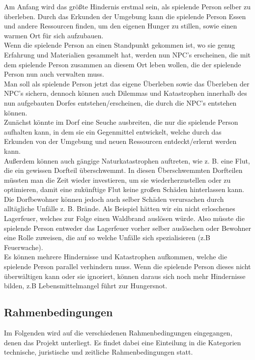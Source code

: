 \documentclass[paper=A4,pagesize=auto,12pt,headinclude=true,footinclude=true,BCOR=0mm,DIV=calc]{scrartcl}
\newcommand{\sectionspace}{
	\vspace{0.5cm}
}
\begin{document}
Am Anfang wird das größte Hindernis erstmal sein, als spielende Person selber zu überleben.
Durch das Erkunden der Umgebung kann die spielende Person Essen und andere Ressourcen finden, um den eigenen Hunger zu stillen, sowie einen warmen Ort für sich aufzubauen.\\
Wenn die spielende Person an einen Standpunkt gekommen ist, wo sie genug Erfahrung und Materialien gesammelt hat, werden nun NPC’s erscheinen, die mit dem spielende Person zusammen an diesem Ort leben wollen, die der spielende Person nun auch verwalten muss.\\
Man soll als spielende Person jetzt das eigene Überleben sowie das Überleben der NPC’s sichern, dennoch können auch Dilemmas und Katastrophen innerhalb des nun aufgebauten Dorfes entstehen/erscheinen, die durch die NPC’s entstehen können.\\
Zunächst könnte im Dorf eine Seuche ausbreiten, die nur die spielende Person aufhalten kann, in dem sie ein Gegenmittel entwickelt, welche durch das Erkunden von der Umgebung und neuen Ressourcen entdeckt/erlernt werden kann. \\
Außerdem können auch gängige Naturkatastrophen auftreten, wie z. B. eine Flut, die ein gewissen Dorfteil überschwemmt. In diesen Überschwemmten Dorfteilen müssten man die Zeit wieder investieren, um sie wiederherzustellen oder zu optimieren, damit eine zukünftige Flut keine großen Schäden hinterlassen kann.\\
Die Dorfbewohner können jedoch auch selber Schäden verursachen durch alltägliche Unfälle z. B. Brände. Als Beispiel hätten wir ein nicht erloschenes Lagerfeuer, welches zur Folge einen Waldbrand auslösen würde. Also müsste die spielende Person entweder das Lagerfeuer vorher selber auslöschen oder Bewohner eine Rolle zuweisen, die auf so welche Unfälle sich spezialisieren (z.B Feuerwache). \\
Es können mehrere Hindernisse und Katastrophen aufkommen, welche die spielende Person parallel verhindern muss. Wenn die spielende Person dieses nicht überwältigen kann oder sie ignoriert, können daraus sich noch mehr Hindernisse bilden, z.B Lebensmittelmangel führt zur Hungersnot.
\sectionspace
\subsection{Rahmenbedingungen}\label{sec:Rahmenbedingungen}
Im Folgenden wird auf die verschiedenen Rahmenbedingungen eingegangen, denen das Projekt unterliegt. Es findet dabei eine Einteilung in die Kategorien technische, juristische und zeitliche Rahmenbedingungen statt. %
\end{document}
